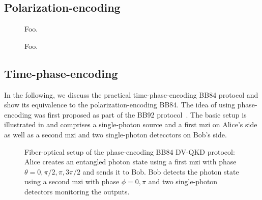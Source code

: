 \FloatBarrier
\subsection{Polarization-encoding}

\begin{figure}[htb]
	\centering
	
	\caption{Foo.}
\end{figure}
\begin{figure}[htb]
	\centering
	
	\caption{Foo.}
\end{figure}

\FloatBarrier
\subsection{Time-phase-encoding}

In the following, we discuss the practical time-phase-encoding BB84 protocol and show its equivalence to the polarization-encoding BB84.
The idea of using phase-encoding was first proposed as part of the BB92 protocol~\cite{Bennett1992}.
The basic setup is illustrated in  and comprises a single-photon source and a first \gls{mzi} on Alice's side as well as a second \gls{mzi} and two single-photon detecctors on Bob's side.
\begin{figure}[htb]
	\centering
	
	\caption{Fiber-optical setup of the phase-encoding BB84 DV-QKD protocol: Alice creates an entangled photon state using a first \gls{mzi} with phase $\theta=0,\pi/2,\pi,3\pi/2$ and sends it to Bob. Bob detects the photon state using a second \gls{mzi} with phase $\phi=0,\pi$ and two single-photon detectors monitoring the outputs.}\label{fig:time_phase_encoding_bb84}
\end{figure}

